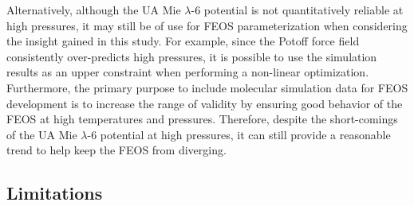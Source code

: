 \documentclass[journal=jctc,manuscript=article]{achemso}
\begin{document}
Alternatively, although the UA Mie $\lambda$-6 potential is not quantitatively reliable at high pressures, it may still be of use for FEOS parameterization when considering the insight gained in this study. For example, since the Potoff force field consistently over-predicts high pressures, it is possible to use the simulation results as an upper constraint when performing a non-linear optimization. Furthermore, the primary purpose to include molecular simulation data for FEOS development is to increase the range of validity by ensuring good behavior of the FEOS at high temperatures and pressures. Therefore, despite the short-comings of the UA Mie $\lambda$-6 potential at high pressures, it can still provide a reasonable trend to help keep the FEOS from diverging.  



\subsection{Limitations} \label{Limitations}
\end{document}
